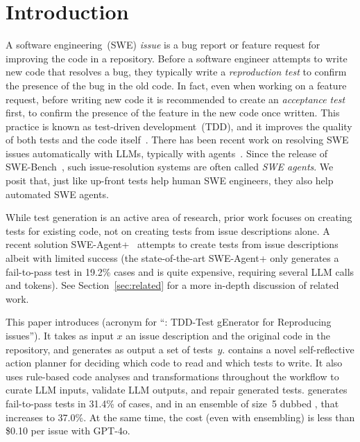 \section{Introduction}\label{sec:intro}

A software engineering~(SWE) \emph{issue} is a bug report or feature
request for improving the code in a repository.
Before a software engineer attempts to write new code that resolves a
bug, they typically write a \emph{reproduction test} to confirm the
presence of the bug in the old code.
In fact, even when working on a feature request, before writing new
code it is recommended to create an \emph{acceptance test} first, to
confirm the presence of the feature in the new code once written.
This practice is known as test-driven development~(TDD), and it
improves the quality of both tests and the
code itself~\cite{beck_2002}.
There has been recent work on resolving SWE
issues automatically with LLMs, typically with
agents~\cite{sweagent2,autocoderover2,opendevin}.
Since the release of SWE-Bench~\cite{jimenezswe}, such
issue-resolution systems are often called \emph{SWE agents}.
We posit that, just like up-front tests
help human SWE engineers, they also help automated SWE agents.


While test generation is an active area of research, prior work focuses
on creating tests for existing code, not on creating tests from
issue descriptions alone. A recent solution \mbox{SWE-Agent+~\cite{mundler2024swtbench}} attempts to create tests from issue descriptions albeit with limited success (the state-of-the-art
SWE-Agent+ only generates a fail-to-pass test in 19.2\% cases and is quite expensive, requiring several LLM calls
and tokens). See Section~\ref{sec:related} for a more in-depth discussion of
related work.

This paper introduces \solx (acronym for ``\solx: TDD-Test gEnerator
for Reproducing issues'').
It takes as input $x$ an issue description and the original code
in the repository, and generates as output a set of tests~$y$.
\solx contains a novel self-reflective action planner for deciding
which code to read and which tests to write.
It also uses rule-based code analyses and transformations throughout
the workflow to curate LLM inputs, validate LLM outputs, and repair
generated tests.
\solx generates fail-to-pass tests in 31.4\% of cases, and in an
ensemble of size~5 dubbed \soly, that increases to 37.0\%.
At the same time, the cost (even with ensembling) is less than \$0.10
per issue with GPT-4o.

